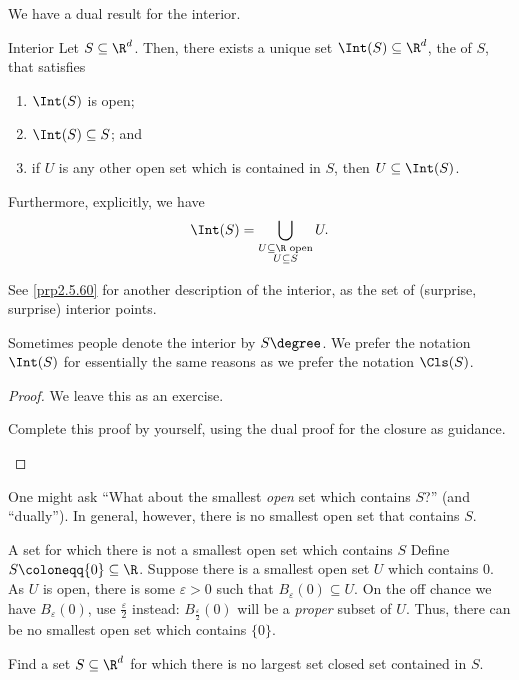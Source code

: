We have a dual result for the interior.
\begin{prp}{Interior}{}
Let $S\subseteq \R ^d$.  Then, there exists a unique set $\Int (S)\subseteq \R ^d$, the  of $S$, that satisfies
\begin{enumerate}
\item $\Int (S)$ is open;
\item $\Int (S)\subseteq S$; and
\item if $U$ is any other open set which is contained in $S$, then $U\subseteq \Int (S)$.
\end{enumerate}
Furthermore, explicitly, we have
\begin{equation}
\Int (S)=\bigcup _{\substack{U\subseteq \R \text{ open} \\ U\subseteq S}}U.
\end{equation}
\begin{rmk}
See \cref{prp2.5.60} for another description of the interior, as the set of (surprise, surprise) interior points.
\end{rmk}
\begin{rmk}
Sometimes people denote the interior by $S\degree$.  We prefer the notation $\Int (S)$ for essentially the same reasons as we prefer the notation $\Cls (S)$.
\end{rmk}
\begin{proof}
We leave this as an exercise.
\begin{exr}[breakable=false]{}{}
Complete this proof by yourself, using the dual proof for the closure as guidance.
\end{exr}
\end{proof}
\end{prp}
One might ask ``What about the smallest \emph{open} set which contains $S$?'' (and ``dually'').  In general, however, there is no smallest open set that contains $S$.
\begin{exm}{A set for which there is not a smallest open set which contains $S$}{}
Define $S\coloneqq \{ 0\} \subseteq \R$.  Suppose there is a smallest open set $U$ which contains $0$.  As $U$ is open, there is some $\varepsilon >0$ such that $B_{\varepsilon}(0)\subseteq U$.  On the off chance we have $B_{\varepsilon}(0)$, use $\frac{\varepsilon}{2}$ instead:  $B_{\frac{\varepsilon}{2}}(0)$ will be a \emph{proper} subset of $U$.  Thus, there can be no smallest open set which contains $\{ 0\}$.
\end{exm}
\begin{exr}{}{}
Find a set $S\subseteq \R ^d$ for which there is no largest set closed set contained in $S$.
\end{exr}

